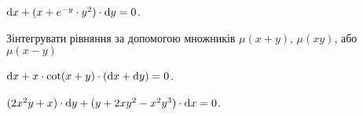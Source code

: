 \begin{problem}
	$\mathop{}\!\mathrm{d} x + (x + e^{-y} \cdot y^2) \cdot \mathop{}\!\mathrm{d} y = 0$.
\end{problem}

Зінтегрувати рівняння за допомогою множників $\mu(x + y)$, $\mu(x y)$, або $\mu(x - y)$

\begin{problem}
	$\mathop{}\!\mathrm{d} x + x \cdot \cot (x + y) \cdot (\mathop{}\!\mathrm{d} x + \mathop{}\!\mathrm{d} y) = 0$.
\end{problem}

\begin{problem}
	$(2 x^2 y + x) \cdot \mathop{}\!\mathrm{d} y + (y + 2 x y^2 - x^2 y^3) \cdot \mathop{}\!\mathrm{d} x = 0$.
\end{problem}
